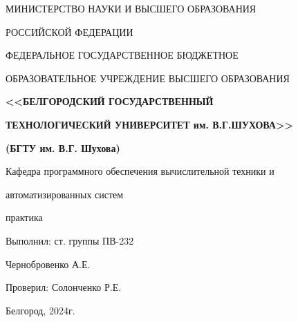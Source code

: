 \begin{center}
	МИНИСТЕРСТВО НАУКИ И ВЫСШЕГО ОБРАЗОВАНИЯ

	РОССИЙСКОЙ ФЕДЕРАЦИИ

	\vskip 0.5cm

	ФЕДЕРАЛЬНОЕ ГОСУДАРСТВЕННОЕ БЮДЖЕТНОЕ

	ОБРАЗОВАТЕЛЬНОЕ УЧРЕЖДЕНИЕ ВЫСШЕГО ОБРАЗОВАНИЯ

	\vskip 0.5cm

	\textbf{<<БЕЛГОРОДСКИЙ ГОСУДАРСТВЕННЫЙ}

	\textbf{ТЕХНОЛОГИЧЕСКИЙ УНИВЕРСИТЕТ им. В.Г.ШУХОВА>>}

	\textbf{(БГТУ им. В.Г. Шухова)}

	\vskip 0.5cm

	Кафедра программного обеспечения вычислительной техники и

	автоматизированных систем

	\vskip 3cm

	\large{ практика}

	\vskip 7cm

	\begin{flushright}
		Выполнил: ст. группы ПВ-232

		Чернобровенко А.Е.

		Проверил: Солонченко Р.Е.
	\end{flushright}

	\vskip 6cm

	Белгород, 2024г.
\end{center}

\newpage

\onehalfspacing\tableofcontents

\newpage
